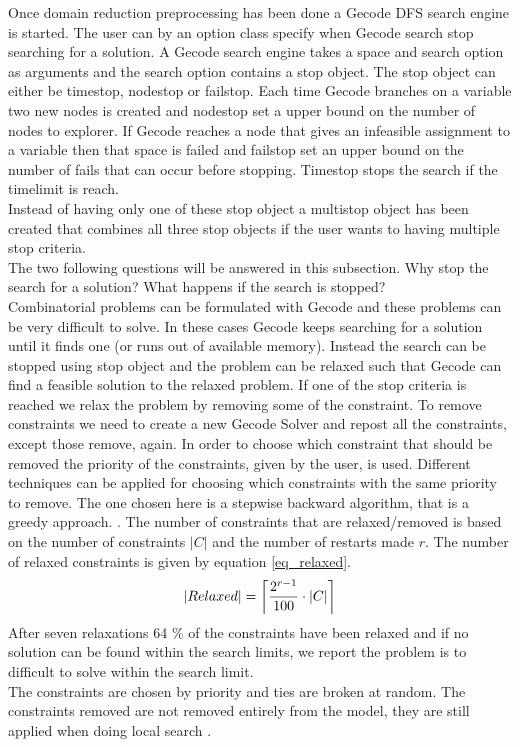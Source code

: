 Once domain reduction preprocessing has been done a Gecode DFS search engine is started. The user can by an option 
class specify when Gecode search stop searching for a solution. A Gecode search engine takes a space and search option 
as arguments and the search option contains a stop object. The stop object can either be timestop, nodestop or 
failstop. Each time Gecode branches on a variable two new nodes is created and nodestop set a upper bound on the number 
of nodes to explorer. If Gecode reaches a node that gives an infeasible assignment to a variable then that space is 
failed and failstop set an upper bound on the number of fails that can occur before stopping. Timestop stops the search 
if the timelimit is reach. \\ 
Instead of having only one of these stop object a multistop object has been created that combines all three stop 
objects if the user wants to having multiple stop criteria. \\ 
The two following questions will be answered in this subsection. Why stop the search for a solution? What happens if the 
search is stopped? \\ 
Combinatorial problems can be formulated with Gecode and these problems can be very difficult to solve. In these cases 
Gecode keeps searching for a solution until it finds one (or runs out of available memory). Instead the search can be 
stopped using stop object and the problem can be relaxed such that Gecode can find a feasible solution to the relaxed 
problem. If one of the stop criteria is reached we relax the problem by removing some of the constraint. To remove 
constraints we need to create a new Gecode Solver and repost all the constraints, except those remove, again. In order 
to choose which constraint that should be removed the priority of the constraints, given by the user, is used. 
Different techniques can be applied for choosing which constraints with the same priority to remove. The 
one chosen here is a stepwise backward algorithm, that is a greedy approach. . The number of constraints that are relaxed/removed is based 
on the number of constraints $|C|$ and the number of restarts made $r$. The number of relaxed constraints is given by 
equation \ref{eq_relaxed}. 
\begin{equation}
 |Relaxed| = \ceil[\bigg]{\frac{2^{r-1}}{100}\cdot |C|}
 \label{eq_relaxed}
\end{equation} 
After seven relaxations 64 \% of the constraints have been relaxed and if no solution can be found within the search 
limits, we report the problem is to difficult to solve within the search limit. \\ 
The constraints are chosen by priority and ties are broken at random. The constraints removed are not removed entirely 
from the model, they are still applied when doing local search . 